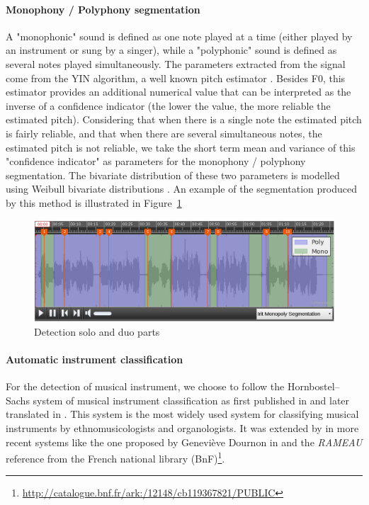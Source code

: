 \documentclass{sig-alternate}
\newcommand{\squeezeup}{\vspace{-2.5mm}}
\begin{document}
\squeezeup\paragraph{Monophony / Polyphony segmentation}
A "monophonic" sound is defined as one note played at a time (either played by an instrument or sung by a singer), while a "polyphonic" sound is defined as several notes played simultaneously. The parameters extracted from the signal come from the YIN algorithm, a well known pitch estimator \cite{DeCheveigne2002}. Besides F0, this estimator provides an additional numerical value that can be interpreted as the inverse of a confidence indicator (the lower the value, the more reliable the estimated pitch). Considering that when there is a single note the estimated pitch is fairly reliable, and that when there are several simultaneous notes, the estimated pitch is not reliable, we take the short term mean and variance of this "confidence indicator" as parameters for the monophony / polyphony segmentation. The bivariate distribution of these two parameters is modelled using Weibull bivariate distributions \cite{Lachambre2011}.
An example of the segmentation produced by this method is illustrated in Figure~\ref{fig:Monopoly}
\begin{figure}[htb]
  \centering
\includegraphics[width=0.95\linewidth]{img/SOLO_DUOdetection.png} 
 \caption{Detection solo and duo parts}
  \label{fig:Monopoly}
\end{figure}

\squeezeup\paragraph{Automatic instrument classification}
For the detection of musical instrument, we choose to follow the Hornbostel–Sachs system of musical instrument classification as first published in \cite{taxonomy_sachs2} and later translated in \cite{taxonomy_sachs}. This system is the most widely used system for classifying musical instruments by ethnomusicologists and organologists. It was extended by in more recent systems like the one proposed by Geneviève Dournon in \cite{Dournon92} and the \emph{RAMEAU} reference from the French national library (BnF)\footnote{\url{http://catalogue.bnf.fr/ark:/12148/cb119367821/PUBLIC}}.
\end{document}
